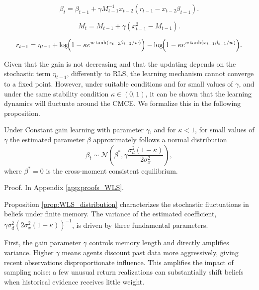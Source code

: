\documentclass[11pt]{article}
\begin{document}
\begin{equation}
    \beta_t = \beta_{t-1} + \gamma M^{-1}_{t-1} x_{t-2} (r_{t-1} - x_{t-2} \beta_{t-1}).
\end{equation}

\begin{equation}
    M_t = M_{t-1} + \gamma \left(x_{t-1}^2 - M_{t-1} \right).
\end{equation}

\begin{equation}\label{eq:constant_gain_returns}
    r_{t-1} = \eta_{t-1}
    + \log\!\Bigl(1 - \kappa e^{w \tanh(x_{t-2} \beta_{t-2} / w)}\Bigr)
    - \log\!\Bigl(1 - \kappa e^{w \tanh(x_{t-1} \beta_{t-1} / w)}\Bigr).
\end{equation} 



Given that the gain is not decreasing and that the updating depends on the stochastic term $\eta_{t-1}$, differently to RLS, the learning mechanism cannot converge to a fixed point.
However, under suitable conditions and for small values of $\gamma$, and under the same stability condition $\kappa \in (0, 1)$, it can be shown that the learning dynamics will fluctuate around the CMCE.
We formalize this in the following proposition.
\begin{proposition} \label{prop:WLS_distribution}
    Under Constant gain learning with parameter $\gamma$, and for $\kappa < 1$, for small values of $\gamma$ the estimated parameter $\beta$ approximately follows a normal distribution
\begin{equation}
    \beta_t \sim \mathcal{N} \left(\beta^*, \gamma \frac{\sigma_d^2 (1 - \kappa)}{2 \sigma^2_x}\right),
\end{equation}
where $\beta^* = 0$ is the cross-moment consistent equilibrium.
\end{proposition}
Proof. In Appendix \ref{app:proofs_WLS}.

Proposition \ref{prop:WLS_distribution} characterizes the stochastic fluctuations in beliefs under finite memory. 
The variance of the estimated coefficient, $\gamma \sigma_d^2 (2\sigma^2_x(1-\kappa))^{-1}$, is driven by three fundamental parameters.

First, the gain parameter $\gamma$ controls memory length and directly amplifies variance. Higher $\gamma$ means agents discount past data more aggressively, giving recent observations disproportionate influence. This amplifies the impact of sampling noise: a few unusual return realizations can substantially shift beliefs when historical evidence receives little weight. 
\end{document}

